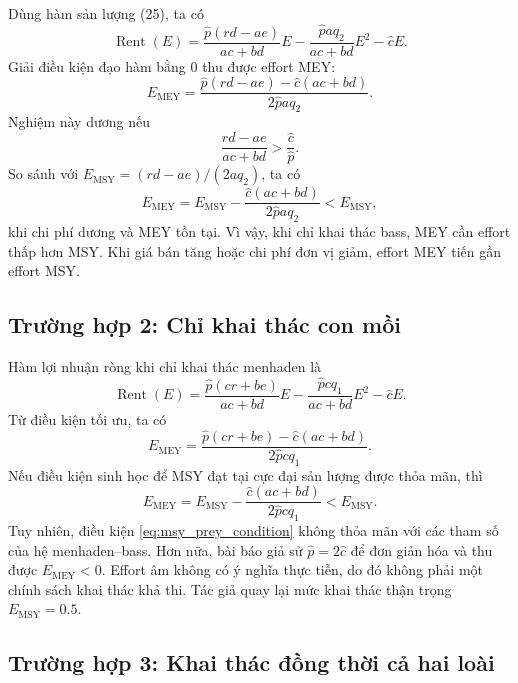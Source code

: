Dùng hàm sản lượng (25), ta có
\begin{equation}
\label{eq:rent_predator}
\operatorname{Rent}(E)=
\frac{\hat{p}(rd-ae)}{ac+bd}E
-\frac{\hat{p}aq_2}{ac+bd}E^2-\hat{c}E.
\tag{28}
\end{equation}
Giải điều kiện đạo hàm bằng 0 thu được effort MEY:
\begin{equation}
\label{eq:mey_predator}
E_{\mathrm{MEY}}=
\frac{\hat{p}(rd-ae)-\hat{c}(ac+bd)}
{2\hat{p}aq_2}.
\tag{29}
\end{equation}
Nghiệm này dương nếu
\[
\frac{rd-ae}{ac+bd}>\frac{\hat{c}}{\hat{p}}.
\]
So sánh với \(E_{\mathrm{MSY}}=(rd-ae)/(2aq_2)\), ta có
\begin{equation}
\label{eq:mey_less_msy}
E_{\mathrm{MEY}}=E_{\mathrm{MSY}}-
\frac{\hat{c}(ac+bd)}{2\hat{p}aq_2}
<E_{\mathrm{MSY}},
\tag{30}
\end{equation}
khi chi phí dương và MEY tồn tại. Vì vậy, khi chỉ khai thác bass, MEY cần effort thấp hơn MSY. Khi giá bán tăng hoặc chi phí đơn vị giảm, effort MEY tiến gần effort MSY.

\subsection{Trường hợp 2: Chỉ khai thác con mồi}

Hàm lợi nhuận ròng khi chỉ khai thác menhaden là
\begin{equation}
\label{eq:rent_prey}
\operatorname{Rent}(E)=
\frac{\hat{p}(cr+be)}{ac+bd}E
-\frac{\hat{p}cq_1}{ac+bd}E^2-\hat{c}E.
\end{equation}
Từ điều kiện tối ưu, ta có
\begin{equation}
\label{eq:mey_prey}
E_{\mathrm{MEY}}=
\frac{\hat{p}(cr+be)-\hat{c}(ac+bd)}
{2\hat{p}cq_1}.
\tag{31}
\end{equation}
Nếu điều kiện sinh học để MSY đạt tại cực đại sản lượng được thỏa mãn, thì
\begin{equation}
\label{eq:mey_prey_compare}
E_{\mathrm{MEY}}=E_{\mathrm{MSY}}-
\frac{\hat{c}(ac+bd)}{2\hat{p}cq_1}
<E_{\mathrm{MSY}}.
\tag{32}
\end{equation}
Tuy nhiên, điều kiện \eqref{eq:msy_prey_condition} không thỏa mãn với các tham số của hệ menhaden--bass. Hơn nữa, bài báo giả sử \(\hat{p}=2\hat{c}\) để đơn giản hóa và thu được \(E_{\mathrm{MEY}}<0\). Effort âm không có ý nghĩa thực tiễn, do đó không phải một chính sách khai thác khả thi. Tác giả quay lại mức khai thác thận trọng \(E_{\mathrm{MSY}}=0.5\).

\subsection{Trường hợp 3: Khai thác đồng thời cả hai loài}

